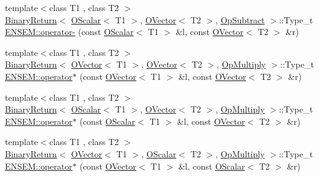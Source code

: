 \begin{DoxyCompactItemize}
\item 
{\footnotesize template$<$class T1 , class T2 $>$ }\\\mbox{\hyperlink{structENSEM_1_1BinaryReturn}{Binary\+Return}}$<$ \mbox{\hyperlink{classENSEM_1_1OScalar}{O\+Scalar}}$<$ T1 $>$, \mbox{\hyperlink{classENSEM_1_1OVector}{O\+Vector}}$<$ T2 $>$, \mbox{\hyperlink{structENSEM_1_1OpSubtract}{Op\+Subtract}} $>$\+::Type\+\_\+t \mbox{\hyperlink{group__obsvector_gaa851105d0e0292f6a8503c61aafb6bb8}{E\+N\+S\+E\+M\+::operator-\/}} (const \mbox{\hyperlink{classENSEM_1_1OScalar}{O\+Scalar}}$<$ T1 $>$ \&l, const \mbox{\hyperlink{classENSEM_1_1OVector}{O\+Vector}}$<$ T2 $>$ \&r)
\item 
{\footnotesize template$<$class T1 , class T2 $>$ }\\\mbox{\hyperlink{structENSEM_1_1BinaryReturn}{Binary\+Return}}$<$ \mbox{\hyperlink{classENSEM_1_1OVector}{O\+Vector}}$<$ T1 $>$, \mbox{\hyperlink{classENSEM_1_1OVector}{O\+Vector}}$<$ T2 $>$, \mbox{\hyperlink{structENSEM_1_1OpMultiply}{Op\+Multiply}} $>$\+::Type\+\_\+t \mbox{\hyperlink{group__obsvector_gaa0cd2e75ed42d1c8d749cbc22ea5d244}{E\+N\+S\+E\+M\+::operator$\ast$}} (const \mbox{\hyperlink{classENSEM_1_1OVector}{O\+Vector}}$<$ T1 $>$ \&l, const \mbox{\hyperlink{classENSEM_1_1OVector}{O\+Vector}}$<$ T2 $>$ \&r)
\item 
{\footnotesize template$<$class T1 , class T2 $>$ }\\\mbox{\hyperlink{structENSEM_1_1BinaryReturn}{Binary\+Return}}$<$ \mbox{\hyperlink{classENSEM_1_1OScalar}{O\+Scalar}}$<$ T1 $>$, \mbox{\hyperlink{classENSEM_1_1OVector}{O\+Vector}}$<$ T2 $>$, \mbox{\hyperlink{structENSEM_1_1OpMultiply}{Op\+Multiply}} $>$\+::Type\+\_\+t \mbox{\hyperlink{group__obsvector_ga8b90f37dfc2d857d5ba547b2639cc97e}{E\+N\+S\+E\+M\+::operator$\ast$}} (const \mbox{\hyperlink{classENSEM_1_1OScalar}{O\+Scalar}}$<$ T1 $>$ \&l, const \mbox{\hyperlink{classENSEM_1_1OVector}{O\+Vector}}$<$ T2 $>$ \&r)
\item 
{\footnotesize template$<$class T1 , class T2 $>$ }\\\mbox{\hyperlink{structENSEM_1_1BinaryReturn}{Binary\+Return}}$<$ \mbox{\hyperlink{classENSEM_1_1OVector}{O\+Vector}}$<$ T1 $>$, \mbox{\hyperlink{classENSEM_1_1OScalar}{O\+Scalar}}$<$ T2 $>$, \mbox{\hyperlink{structENSEM_1_1OpMultiply}{Op\+Multiply}} $>$\+::Type\+\_\+t \mbox{\hyperlink{group__obsvector_gabb4c9b103a03a23a7cc8db755ded0b7c}{E\+N\+S\+E\+M\+::operator$\ast$}} (const \mbox{\hyperlink{classENSEM_1_1OVector}{O\+Vector}}$<$ T1 $>$ \&l, const \mbox{\hyperlink{classENSEM_1_1OScalar}{O\+Scalar}}$<$ T2 $>$ \&r)

\end{DoxyCompactItemize}
